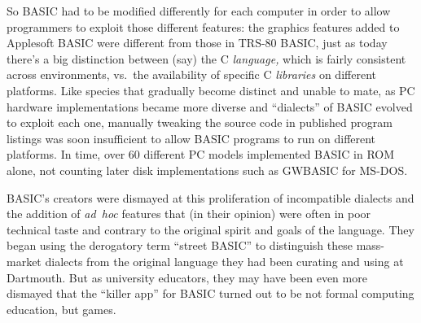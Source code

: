 So BASIC had to be modified differently for each computer in order to
allow programmers to exploit those different features: the graphics
features added to Applesoft BASIC were different from those in TRS-80
BASIC, just as today there's a big distinction between (say)
the C \emph{language,} which is fairly consistent across environments, vs.\ the
availability of specific C \emph{libraries} on different platforms.
Like species that
gradually become distinct and unable to mate, 
as PC hardware implementations became more diverse and ``dialects'' of BASIC
evolved to exploit each one, manually tweaking the source code in published program
listings was soon insufficient to allow BASIC programs to run on
different platforms.
In time, over 60
different PC models implemented BASIC in ROM alone, not counting later
disk implementations such as GWBASIC for MS-DOS.

BASIC's creators were dismayed at this proliferation of incompatible
dialects and the addition of \emph{ad~hoc} features that (in their
opinion) were often in poor technical taste and contrary to
the original spirit and goals of the language.
They began using the derogatory term ``street BASIC'' to distinguish
these mass-market dialects from the original language they had been
curating and using at Dartmouth.
But as university educators, they may have been even more dismayed that
the ``killer app'' for BASIC turned out to be not formal computing
education, but games.
